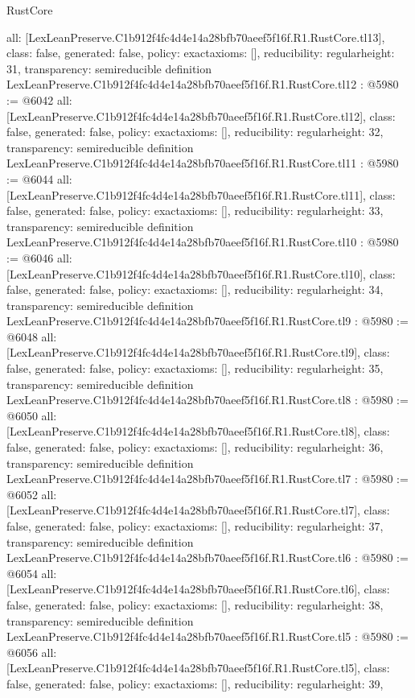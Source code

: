 \begin{lexlean}{RustCore}
\begin{coremodule}
{  all: [LexLeanPreserve.C1b912f4fc4d4e14a28bfb70aeef5f16f.R1.RustCore.tl13],
  class: false,
  generated: false,
  policy: exact{axioms: []},
  reducibility: regular{height: 31},
  transparency: semireducible
}
definition LexLeanPreserve.C1b912f4fc4d4e14a28bfb70aeef5f16f.R1.RustCore.tl12 : @5980 := @6042 {
  all: [LexLeanPreserve.C1b912f4fc4d4e14a28bfb70aeef5f16f.R1.RustCore.tl12],
  class: false,
  generated: false,
  policy: exact{axioms: []},
  reducibility: regular{height: 32},
  transparency: semireducible
}
definition LexLeanPreserve.C1b912f4fc4d4e14a28bfb70aeef5f16f.R1.RustCore.tl11 : @5980 := @6044 {
  all: [LexLeanPreserve.C1b912f4fc4d4e14a28bfb70aeef5f16f.R1.RustCore.tl11],
  class: false,
  generated: false,
  policy: exact{axioms: []},
  reducibility: regular{height: 33},
  transparency: semireducible
}
definition LexLeanPreserve.C1b912f4fc4d4e14a28bfb70aeef5f16f.R1.RustCore.tl10 : @5980 := @6046 {
  all: [LexLeanPreserve.C1b912f4fc4d4e14a28bfb70aeef5f16f.R1.RustCore.tl10],
  class: false,
  generated: false,
  policy: exact{axioms: []},
  reducibility: regular{height: 34},
  transparency: semireducible
}
definition LexLeanPreserve.C1b912f4fc4d4e14a28bfb70aeef5f16f.R1.RustCore.tl9 : @5980 := @6048 {
  all: [LexLeanPreserve.C1b912f4fc4d4e14a28bfb70aeef5f16f.R1.RustCore.tl9],
  class: false,
  generated: false,
  policy: exact{axioms: []},
  reducibility: regular{height: 35},
  transparency: semireducible
}
definition LexLeanPreserve.C1b912f4fc4d4e14a28bfb70aeef5f16f.R1.RustCore.tl8 : @5980 := @6050 {
  all: [LexLeanPreserve.C1b912f4fc4d4e14a28bfb70aeef5f16f.R1.RustCore.tl8],
  class: false,
  generated: false,
  policy: exact{axioms: []},
  reducibility: regular{height: 36},
  transparency: semireducible
}
definition LexLeanPreserve.C1b912f4fc4d4e14a28bfb70aeef5f16f.R1.RustCore.tl7 : @5980 := @6052 {
  all: [LexLeanPreserve.C1b912f4fc4d4e14a28bfb70aeef5f16f.R1.RustCore.tl7],
  class: false,
  generated: false,
  policy: exact{axioms: []},
  reducibility: regular{height: 37},
  transparency: semireducible
}
definition LexLeanPreserve.C1b912f4fc4d4e14a28bfb70aeef5f16f.R1.RustCore.tl6 : @5980 := @6054 {
  all: [LexLeanPreserve.C1b912f4fc4d4e14a28bfb70aeef5f16f.R1.RustCore.tl6],
  class: false,
  generated: false,
  policy: exact{axioms: []},
  reducibility: regular{height: 38},
  transparency: semireducible
}
definition LexLeanPreserve.C1b912f4fc4d4e14a28bfb70aeef5f16f.R1.RustCore.tl5 : @5980 := @6056 {
  all: [LexLeanPreserve.C1b912f4fc4d4e14a28bfb70aeef5f16f.R1.RustCore.tl5],
  class: false,
  generated: false,
  policy: exact{axioms: []},
  reducibility: regular{height: 39},
}
\end{coremodule}
\end{lexlean}
